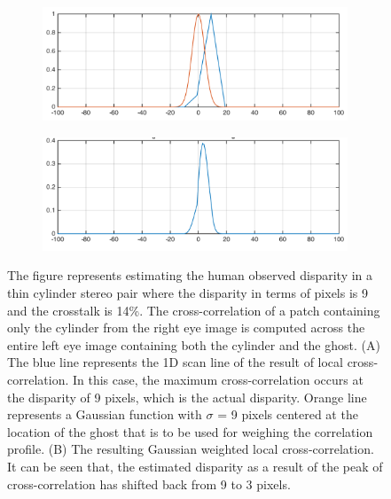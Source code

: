 \begin{figure}[htbp]
    \centering
    \begin{subfigure}[b]{0.9\textwidth}
        \includegraphics[width=\textwidth]{./Template_Figures/normal_ccr}
        \caption{}\label{fig:normal_ccr}
    \end{subfigure}

    \begin{subfigure}[b]{0.9\textwidth}
        \includegraphics[width=\textwidth]{./Template_Figures/windowed_ccr}
        \caption{}\label{fig:windowed_ccr}
    \end{subfigure}

    \caption{The figure represents estimating the human observed disparity in a thin cylinder stereo pair where the disparity in terms of pixels is 9 and the crosstalk is 14\%. The cross-correlation of a patch containing only the cylinder from the right eye image is computed across the entire left eye image containing both the cylinder and the ghost. (A) The blue line represents the 1D scan line of the result of local cross-correlation. In this case, the maximum cross-correlation occurs at the disparity of 9 pixels, which is the actual disparity. Orange line represents a Gaussian function with $\sigma$ = 9 pixels centered at the location of the ghost that is to be used for weighing the correlation profile. (B) The resulting Gaussian weighted local cross-correlation. It can be seen that, the estimated disparity as a result of the peak of cross-correlation has shifted back from 9 to 3 pixels.\label{fig:windowed_ccr_f}}
\end{figure}


